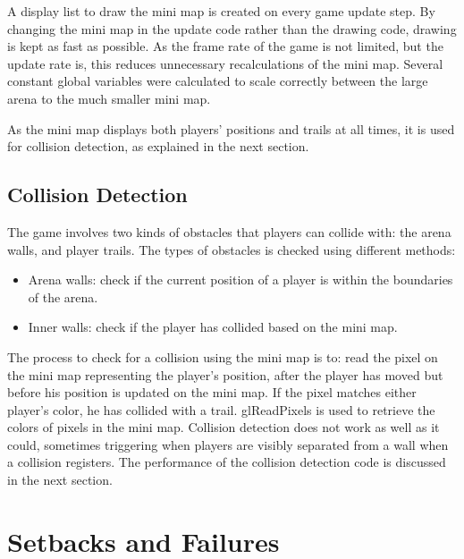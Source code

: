 \documentclass[12pt]{article}
\begin{document}
A display list to draw the mini map is created on every game update step.  By changing the mini map in the update code rather than the drawing code, drawing is kept as fast as possible.  As the frame rate of the game is not limited, but the update rate is, this reduces unnecessary recalculations of the mini map.  Several constant global variables were calculated to scale correctly between the large arena to the much smaller mini map.

As the mini map displays both players' positions and trails at all times, it is used for collision detection, as explained in the next section.

\subsection{Collision Detection}

The game involves two kinds of obstacles that players can collide with: the arena walls, and player trails.  The types of obstacles is checked using different methods:

\begin{itemize}
\item Arena walls: check if the current position of a player is within the boundaries of the arena.
\item Inner walls: check if the player has collided based on the mini map.
\end{itemize}

The process to check for a collision using the mini map is to: read the pixel on the mini map representing the player's position, after the player has moved but before his position is updated on the mini map.  If the pixel matches either player's color, he has collided with a trail.  glReadPixels is used to retrieve the colors of pixels in the mini map.  Collision detection does not work as well as it could, sometimes triggering when players are visibly separated from a wall when a collision registers.  The performance of the collision detection code is discussed in the next section.

\section{Setbacks and Failures}
\label{sec:setbacks}
\end{document}
